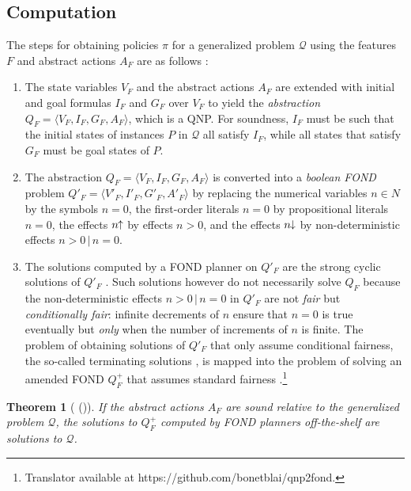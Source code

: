 \documentclass[letterpaper]{article} %
\newcommand{\tup}[1]{\langle #1 \rangle}
\newcommand{\citeay}[1]{\citeauthor{#1} (\citeyear{#1})}
\newtheorem{theorem}[definition]{Theorem}
\newcommand{\Q}{\mathcal{Q}}
\newcommand{\pplus}{\hspace{-.05em}\raisebox{.15ex}{\footnotesize$\uparrow$}}
\newcommand{\mminus}{\hspace{-.05em}\raisebox{.15ex}{\footnotesize$\downarrow$}}
\begin{document}
\subsection{Computation}

The steps for obtaining policies $\pi$ for a generalized problem $\Q$
using the features $F$ and abstract actions $A_F$ are as follows \cite{bonet:ijcai2018}:

\begin{enumerate}[1.]
  \item The state variables $V_F$ and the abstract actions $A_F$ are
    extended with initial and goal formulas $I_F$ and $G_F$ over $V_F$
    to yield the \emph{abstraction}  $Q_F=\tup{V_F,I_F,G_F,A_F}$,
    which is a QNP. For soundness, $I_F$ must be such that
    the initial states of instances $P$ in $\Q$ all satisfy $I_F$, while
    all states that satisfy $G_F$ must be goal states of $P$.
%
  \item The abstraction $Q_F=\tup{V_F,I_F,G_F,A_F}$ is converted into a
    \emph{boolean FOND} problem $Q'_F=\tup{V'_F,I'_F,G'_F,A'_F}$ by
    replacing the numerical variables $n\in N$ by the symbols $n=0$,
    the first-order literals $n=0$ by propositional literals  $n=0$, 
    the effects $n\pplus$ by effects $n > 0$, and the
    effects $n\mminus$ by non-deterministic effects $n>0\,|\,n=0$.
%
  \item The solutions computed by a FOND planner on $Q'_F$ are the
    strong cyclic solutions of $Q'_F$ \cite{strong-cyclic}.
    Such solutions however do not necessarily solve $Q_F$ because the
    non-deterministic effects $n>0\,|\,n=0$ in $Q'_F$ are not \emph{fair} but
    \emph{conditionally fair}: infinite decrements of $n$ ensure that 
    $n=0$ is true eventually but \emph{only} when  the number of increments of $n$ is finite.
    The problem of obtaining solutions of $Q'_F$ that only assume conditional
    fairness, the so-called terminating solutions \cite{srivastava:aaai2011},
    is mapped into the problem of solving an amended FOND $Q^+_F$ that
    assumes standard  fairness \cite{bonet:ijcai2017}.\footnote{Translator
    available at  https://github.com/bonetblai/qnp2fond.}
\end{enumerate}


\begin{theorem}[\citeay{bonet:ijcai2018}]
If the abstract actions  $A_F$ are sound relative to the generalized problem $\Q$, the  solutions  to $Q^+_F$
computed by FOND planners off-the-shelf  are solutions to $\Q$.
\end{theorem}
\end{document}
